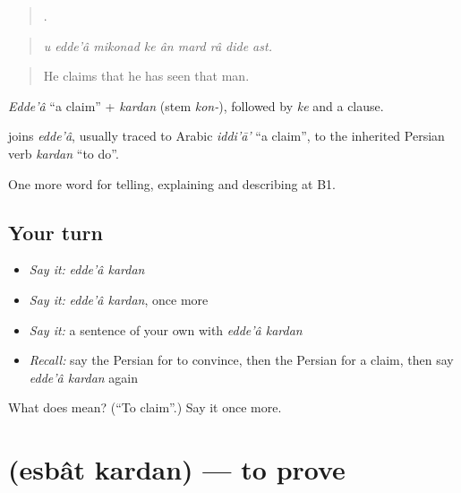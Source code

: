 \begin{quote}
        .
\end{quote}

\begin{quote}
\emph{u edde'â mikonad ke ân mard râ dide ast.}
\end{quote}

\begin{quote}
He claims that he has seen that man.
\end{quote}

\emph{Edde'â} \textquotedblleft{}a claim\textquotedblright{} + \emph{kardan} (stem \emph{kon-}), followed by \emph{ke} and a clause.

\begin{cousinweb}
\textbf{ } joins \emph{edde'â}, usually traced to Arabic \emph{iddi'ā'} \textquotedblleft{}a claim\textquotedblright{}, to the inherited Persian verb \emph{kardan} \textquotedblleft{}to do\textquotedblright{}.
\end{cousinweb}

\begin{grammarlens}[title={What you've built}]
One more word for telling, explaining and describing at B1.
\end{grammarlens}

\subsection*{Your turn}
\begin{itemize}
\raggedright
  \item \emph{Say it:} \emph{edde'â kardan}
  \item \emph{Say it:} \emph{edde'â kardan}, once more
  \item \emph{Say it:} a sentence of your own with \emph{edde'â kardan}
  \item \emph{Recall:} say the Persian for to convince, then the Persian for a claim, then say \emph{edde'â kardan} again
\end{itemize}

\begin{tcolorbox}[breakable,colback=teal!4,colframe=teal!35!black,title={Before you move on}]
What does   mean? (\textquotedblleft{}To claim\textquotedblright{}.) Say it once more.
\end{tcolorbox}
\section[\texorpdfstring{\fa{اثبات} \fa{کردن} (esbât kardan)}{اثبات کردن (esbât kardan)}]{  (esbât kardan) — to prove}

